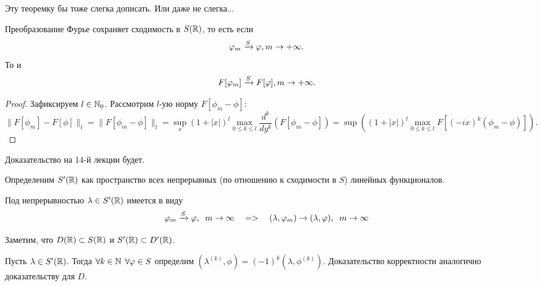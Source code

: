 \begin{note}
    Эту теоремку бы тоже слегка дописать.
    Или даже не слегка...
\end{note}
\begin{theorem}
    Преобразование Фурье сохраняет сходимость в $S(\mathbb{R})$, то есть если
    \[
        \varphi_m \xrightarrow{S} \varphi, m \rightarrow +\infty.
    \]
    То и
    \[
        F[\varphi_m] \xrightarrow{S} F[\varphi], m \rightarrow +\infty.
    \]
\end{theorem}
\begin{proof}
    Зафиксируем $l \in \mathbb{N}_0$.
    Рассмотрим $l$-ую норму $F[\phi_m - \phi]$:
    \[
        \|F[\phi_m] - F[\phi]\|_{l} = \|F[\phi_m - \phi]\|_{l} = \sup \limits_x (1 + |x|)^l \max\limits_{0 \leq k \leq l} \dfrac{d^k}{dy^k}(F[\phi_m - \phi]) = \sup ((1 + |x|)^l \max\limits_{0 \leq k \leq l} F[(-ix)^k(\phi_m - \phi)]).
    \]
\end{proof}
\begin{note}
    Доказательство на 14-й лекции будет.
\end{note}
\begin{definition}
    Определеним $S'(\mathbb{R})$ как пространство всех непрерывных (по отношению к сходимости в $S$) линейных функционалов.
\end{definition}
\begin{note}
    Под непрерывностью $\lambda \in S'(\mathbb{R})$ имеется в виду
    \[ \varphi_m \xrightarrow{S} \varphi, \;\; m \rightarrow \infty \quad => \quad (\lambda, \varphi_m) \rightarrow (\lambda, \varphi), \;\; m \rightarrow \infty
    \]
\end{note}
\begin{note}
    Заметим, что $D(\mathbb{R}) \subset S(\mathbb{R})$ и $S'(\mathbb{R}) \subset D'(\mathbb{R})$.
\end{note}
\begin{definition}
    Пусть $\lambda \in S'(\mathbb{R})$.
    Тогда $\forall k \in \mathbb{N} \;\, \forall \varphi \in S$ определим $(\lambda^{(k)}, \phi) = (-1)^k (\lambda, \phi^{(k)})$.
    Доказательство корректности аналогично доказательству для $D$.
\end{definition}